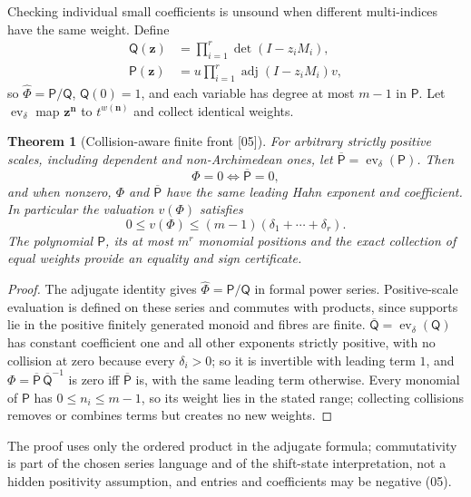 \documentclass[11pt,oneside]{article}
\numberwithin{equation}{section}
\newtheorem{theorem}{Theorem}[section]
\theoremstyle{definition}
\theoremstyle{remark}
\newcommand{\adj}{\operatorname{adj}}
\newcommand{\ev}{\operatorname{ev}}
\newcommand{\src}[1]{\textup{\textsf{\small[#1]}}}
\begin{document}
Checking individual small coefficients is unsound when different multi-indices
have the same weight. Define
\begin{align}
 \mathsf Q(\mathbf z)&=\prod_{i=1}^r\det(I-z_iM_i),\label{onot:sh:eq:Q}\\
 \mathsf P(\mathbf z)&=u\prod_{i=1}^r\adj(I-z_iM_i)v,\label{onot:sh:eq:P}
\end{align}
so $\widehat\Phi=\mathsf P/\mathsf Q$, $\mathsf Q(0)=1$, and each variable has
degree at most $m-1$ in $\mathsf P$. Let $\ev_\delta$ map
$\mathbf z^{\mathbf n}$ to $t^{w(\mathbf n)}$ and collect identical weights.

\begin{theorem}[Collision-aware finite front \src{05}]\label{onot:sh:thm:collision}
For arbitrary strictly positive scales, including dependent and non-Archimedean
ones, let $\overline{\mathsf P}=\ev_\delta(\mathsf P)$. Then
\begin{equation}\label{onot:sh:eq:collisionzero}
 \Phi=0\iff\overline{\mathsf P}=0,
\end{equation}
and when nonzero, $\Phi$ and $\overline{\mathsf P}$ have the same leading Hahn
exponent and coefficient. In particular the valuation $v(\Phi)$ satisfies
\begin{equation}\label{onot:sh:eq:frontbound}
 0\le v(\Phi)\le(m-1)(\delta_1+\cdots+\delta_r).
\end{equation}
The polynomial $\mathsf P$, its at most $m^r$ monomial positions and the exact
collection of equal weights provide an equality and sign certificate.
\end{theorem}
\begin{proof}
The adjugate identity gives $\widehat\Phi=\mathsf P/\mathsf Q$ in formal power
series. Positive-scale evaluation is defined on these series and commutes with
products, since supports lie in the positive finitely generated monoid and fibres
are finite. $\overline{\mathsf Q}=\ev_\delta(\mathsf Q)$ has constant coefficient
one and all other exponents strictly positive, with no collision at zero because
every $\delta_i>0$; so it is invertible with leading term $1$, and
$\Phi=\overline{\mathsf P}\,\overline{\mathsf Q}^{-1}$ is zero iff
$\overline{\mathsf P}$ is, with the same leading term otherwise. Every monomial of
$\mathsf P$ has $0\le n_i\le m-1$, so its weight lies in the stated range;
collecting collisions removes or combines terms but creates no new weights.
\end{proof}

The proof uses only the ordered product in the adjugate formula; commutativity is
part of the chosen series language and of the shift-state interpretation, not a
hidden positivity assumption, and entries and coefficients may be negative (05).
\end{document}
